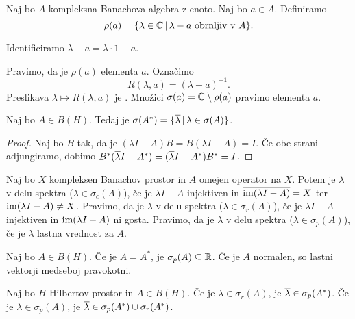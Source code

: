 
Naj bo $A$ kompleksna Banachova algebra z enoto.
Naj bo $a \in A$.
Definiramo
\[
  \rho(a) = \{ \lambda \in \mathbb{C} \,|\, \text{$\lambda - a$ obrnljiv v $A$} \}.
\]

\begin{opomba}
  Identificiramo $\lambda - a = \lambda \cdot 1 - a$.
\end{opomba}

Pravimo, da je $\rho(a)$  elementa $a$.
Označimo
\[
  R(\lambda, a) = (\lambda - a)^{-1}.
\]
Preslikava $\lambda \mapsto R(\lambda, a)$ je .
Množici $\sigma(a) = \mathbb{C} \setminus \rho(a)$ pravimo  elementa $a$.

\begin{trditev}
  Naj bo $A \in B(H)$.
  Tedaj je $\sigma(A^*) = \{ \overline{\lambda} \,|\, \lambda \in \sigma(A) \}$.
\end{trditev}

\begin{proof}
  Naj bo $B$ tak, da je $(\lambda I - A) B = B(\lambda I - A) = I$.
  Če obe strani adjungiramo, dobimo $B^* (\overline{\lambda} I - A^*) =
  (\overline{\lambda} I - A^*) B^* = I$.
\end{proof}

\begin{definicija}
  Naj bo $X$ kompleksen Banachov prostor in $A$ omejen operator na $X$.
  Potem je $\lambda$ v  delu spektra ($\lambda \in \sigma_c(A)$),
  če je $\lambda I - A$ injektiven in $\overline{\operatorname{im}(\lambda I - A)} = X$ ter
  $\operatorname{im}(\lambda I - A) \ne X$.
  Pravimo, da je $\lambda$ v  delu spektra ($\lambda \in
  \sigma_r(A)$), če je $\lambda I - A$ injektiven in $\operatorname{im} (\lambda I - A)$ ni
  gosta.
  Pravimo, da je $\lambda$ v  delu spektra ($\lambda \in
  \sigma_p(A)$), če je $\lambda$ lastna vrednost za $A$.
\end{definicija}


\begin{trditev}
  Naj bo $A \in B(H)$.
  Če je $A = A^*$, je $\sigma_p(A) \subseteq \mathbb{R}$.
  Če je $A$ normalen, so lastni vektorji medseboj pravokotni.
\end{trditev}

\begin{trditev}
  Naj bo $H$ Hilbertov prostor in $A \in B(H)$.
  Če je $\lambda \in \sigma_r(A)$, je $\overline{\lambda} \in \sigma_p(A^*)$.
  Če je $\lambda \in \sigma_p(A)$, je $\overline{\lambda} \in \sigma_p(A^*) \cup
  \sigma_r(A^*)$.
\end{trditev}

